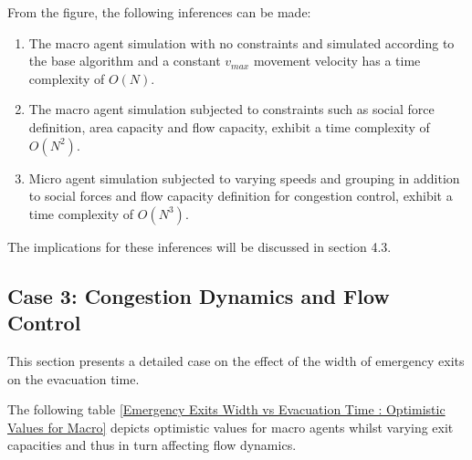 From the figure, the following inferences can be made:

\begin{enumerate}
  \item The macro agent simulation with no constraints and simulated according to the base algorithm and a constant $v_{max}$ movement velocity has a time complexity of $O(N)$.
  \item The macro agent simulation subjected to constraints such as social force definition, area capacity and flow capacity, exhibit a time complexity of $O(N^2)$.
  \item Micro agent simulation subjected to varying speeds and grouping in addition to social forces and flow capacity definition for congestion control, exhibit a time complexity of $O(N^3)$.
\end{enumerate}

The implications for these inferences will be discussed in section 4.3.


\subsection{Case 3: Congestion Dynamics and Flow Control}
\label{sec: Case 3: Congestion Dynamics and Flow Control}

This section presents a detailed case on the effect of the width of emergency exits on the evacuation time. 


The following table \ref{Emergency Exits Width vs Evacuation Time : Optimistic Values for Macro} depicts optimistic values for macro agents whilst varying exit capacities and thus in turn affecting flow dynamics.

